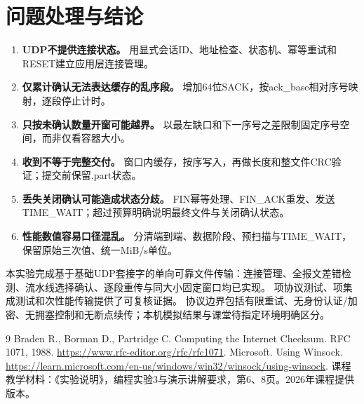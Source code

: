 \documentclass[UTF8,notitlepage,11pt]{ctexart}
\begin{document}
\section{问题处理与结论}
\begin{enumerate}
\item \textbf{UDP不提供连接状态。} 用显式会话ID、地址检查、状态机、幂等重试和RESET建立应用层连接管理。
\item \textbf{仅累计确认无法表达缓存的乱序段。} 增加64位SACK，按ack\_base相对序号映射，逐段停止计时。
\item \textbf{只按未确认数量开窗可能越界。} 以最左缺口和下一序号之差限制固定序号空间，而非仅看容器大小。
\item \textbf{收到不等于完整交付。} 窗口内缓存，按序写入，再做长度和整文件CRC验证；提交前保留.part状态。
\item \textbf{丢失关闭确认可能造成状态分歧。} FIN幂等处理、FIN\_ACK重发、发送TIME\_WAIT；超过预算明确说明最终文件与关闭确认状态。
\item \textbf{性能数值容易口径混乱。} 分清端到端、数据阶段、预扫描与TIME\_WAIT，保留原始三次值、统一MiB/s单位。
\end{enumerate}

本实验完成基于基础UDP套接字的单向可靠文件传输：连接管理、全报文差错检测、流水线选择确认、逐段重传与同大小固定窗口均已实现。
\UnitCount{}项协议测试、\IntegrationCount{}项集成测试和\BenchRuns{}次性能传输提供了可复核证据。
协议边界包括有限重试、无身份认证/加密、无拥塞控制和无断点续传；本机模拟结果与课堂待指定环境明确区分。

\begin{thebibliography}{9}
 Braden R., Borman D., Partridge C. Computing the Internet Checksum. RFC 1071, 1988.
\url{https://www.rfc-editor.org/rfc/rfc1071}.
 Microsoft. Using Winsock.
\url{https://learn.microsoft.com/en-us/windows/win32/winsock/using-winsock}.
 课程教学材料：《实验说明》，编程实验3与演示讲解要求，第6、8页。2026年课程提供版本。
\end{thebibliography}
\end{document}
